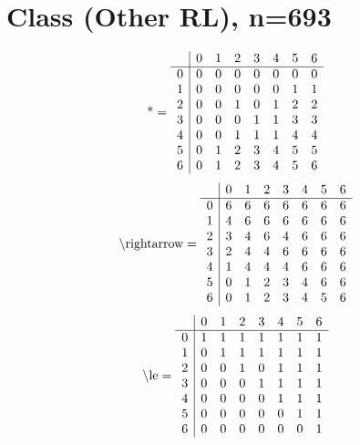 \documentclass[11pt]{article}
\begin{document}
\section{Class (Other RL), n=693}
\[\text{*} = 
\begin{array}{r | r r r r r r r}
 & 0 & 1 & 2 & 3 & 4 & 5 & 6 \\ \hline
0 & 0 & 0 & 0 & 0 & 0 & 0 & 0 \\
1 & 0 & 0 & 0 & 0 & 0 & 1 & 1 \\
2 & 0 & 0 & 1 & 0 & 1 & 2 & 2 \\
3 & 0 & 0 & 0 & 1 & 1 & 3 & 3 \\
4 & 0 & 0 & 1 & 1 & 1 & 4 & 4 \\
5 & 0 & 1 & 2 & 3 & 4 & 5 & 5 \\
6 & 0 & 1 & 2 & 3 & 4 & 5 & 6 \\
\end{array}
\]
\[\text{\textbackslash rightarrow} = 
\begin{array}{r | r r r r r r r}
 & 0 & 1 & 2 & 3 & 4 & 5 & 6 \\ \hline
0 & 6 & 6 & 6 & 6 & 6 & 6 & 6 \\
1 & 4 & 6 & 6 & 6 & 6 & 6 & 6 \\
2 & 3 & 4 & 6 & 4 & 6 & 6 & 6 \\
3 & 2 & 4 & 4 & 6 & 6 & 6 & 6 \\
4 & 1 & 4 & 4 & 4 & 6 & 6 & 6 \\
5 & 0 & 1 & 2 & 3 & 4 & 6 & 6 \\
6 & 0 & 1 & 2 & 3 & 4 & 5 & 6 \\
\end{array}
\]
\[\text{\textbackslash le} = 
\begin{array}{r | r r r r r r r}
 & 0 & 1 & 2 & 3 & 4 & 5 & 6 \\ \hline
0 & 1 & 1 & 1 & 1 & 1 & 1 & 1 \\
1 & 0 & 1 & 1 & 1 & 1 & 1 & 1 \\
2 & 0 & 0 & 1 & 0 & 1 & 1 & 1 \\
3 & 0 & 0 & 0 & 1 & 1 & 1 & 1 \\
4 & 0 & 0 & 0 & 0 & 1 & 1 & 1 \\
5 & 0 & 0 & 0 & 0 & 0 & 1 & 1 \\
6 & 0 & 0 & 0 & 0 & 0 & 0 & 1 \\
\end{array}
\]
\end{document}
